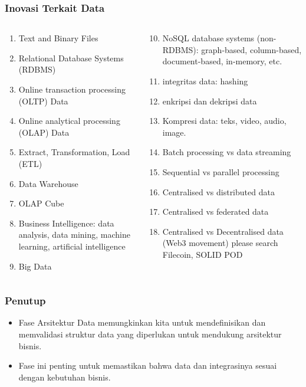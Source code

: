 \documentclass[aspectratio=169]{beamer}
\begin{document}
\begin{frame}
	\frametitle{Inovasi Terkait Data}
	\begin{columns}
		\begin{column}{0.5\textwidth}
			\begin{center}
				\begin{enumerate}
					\item Text and Binary Files
					\item Relational Database Systems (RDBMS)
					\item Online transaction processing (OLTP) Data
					\item Online analytical processing (OLAP) Data
					\item Extract, Transformation, Load (ETL)
					\item Data Warehouse 
					\item OLAP Cube
					\item Business Intelligence: data analysis, data mining, machine learning, artificial intelligence
					\item Big Data
				\end{enumerate}
			\end{center}
		\end{column}
		\begin{column}{0.5\textwidth}
			\begin{center}
				\begin{enumerate}
					\setcounter{enumi}{9}
					
					\item NoSQL database systems (non-RDBMS): graph-based, column-based, document-based, in-memory, etc.
					\item integritas data: hashing
					\item enkripsi dan dekripsi data
					\item Kompresi data: teks, video, audio, image.
					\item Batch processing vs data streaming
					\item Sequential vs parallel processing
					\item Centralised vs distributed data
					\item Centralised vs federated data
					\item Centralised vs Decentralised data (Web3 movement) please search Filecoin, SOLID POD
				\end{enumerate}
			\end{center}
		\end{column}
	\end{columns}
\end{frame}

\begin{frame}
	\frametitle{Penutup}
	\begin{itemize}
		\item Fase Arsitektur Data memungkinkan kita untuk mendefinisikan dan memvalidasi struktur data yang diperlukan untuk mendukung arsitektur bisnis. 
		\item Fase ini penting untuk memastikan bahwa data dan integrasinya sesuai dengan kebutuhan bisnis.
	\end{itemize}
\end{frame}
\end{document}
